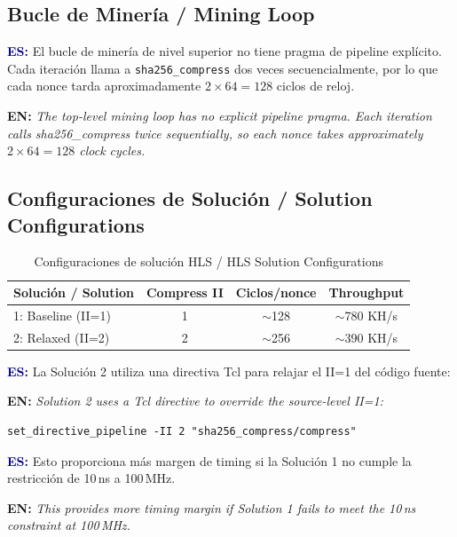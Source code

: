 \documentclass[12pt,a4paper]{article}
\newcommand{\es}[1]{\foreignlanguage{spanish}{#1}}
\newcommand{\en}[1]{\foreignlanguage{english}{#1}}
\newcommand{\bsubsection}[2]{%
    \subsection{#1 \textnormal{\small\color{accentblue}/ #2}}%
}
\newenvironment{bilingual}{%
    \par\medskip
}{%
    \par\medskip
}
\newcommand{\espara}[1]{\noindent\textcolor{darkblue}{\textbf{ES:}} #1\par\smallskip}
\newcommand{\enpara}[1]{\noindent\textcolor{accentblue}{\textbf{EN:}} \textit{#1}\par\smallskip}
\begin{document}
\bsubsection{Bucle de Miner\'ia}{Mining Loop}

\begin{bilingual}
\espara{%
El bucle de miner\'ia de nivel superior no tiene pragma de pipeline expl\'icito.
Cada iteraci\'on llama a \texttt{sha256\_compress} dos veces secuencialmente,
por lo que cada nonce tarda aproximadamente $2 \times 64 = 128$ ciclos de reloj.}

\enpara{%
The top-level mining loop has no explicit pipeline pragma. Each iteration
calls sha256\_compress twice sequentially, so each nonce takes approximately
$2 \times 64 = 128$ clock cycles.}
\end{bilingual}

\bsubsection{Configuraciones de Soluci\'on}{Solution Configurations}

\begin{table}[h]
    \centering
    \caption{\es{Configuraciones de soluci\'on HLS} / \en{HLS Solution Configurations}}
    \begin{tabular}{@{}lccc@{}}
        \toprule
        \textbf{\es{Soluci\'on} / \en{Solution}} & \textbf{Compress II} & \textbf{\es{Ciclos}/nonce} & \textbf{Throughput} \\
        \midrule
        1: Baseline (II=1) & 1 & $\sim$128 & $\sim$780 KH/s \\
        2: Relaxed (II=2)  & 2 & $\sim$256 & $\sim$390 KH/s \\
        \bottomrule
    \end{tabular}
\end{table}

\begin{bilingual}
\espara{%
La Soluci\'on 2 utiliza una directiva Tcl para relajar el II=1 del c\'odigo fuente:}

\enpara{%
Solution 2 uses a Tcl directive to override the source-level II=1:}
\end{bilingual}

\begin{lstlisting}[style=tclstyle]
set_directive_pipeline -II 2 "sha256_compress/compress"
\end{lstlisting}

\begin{bilingual}
\espara{%
Esto proporciona m\'as margen de timing si la Soluci\'on 1 no cumple la restricci\'on
de 10\,ns a 100\,MHz.}

\enpara{%
This provides more timing margin if Solution 1 fails to meet the 10\,ns constraint
at 100\,MHz.}
\end{bilingual}
\end{document}

